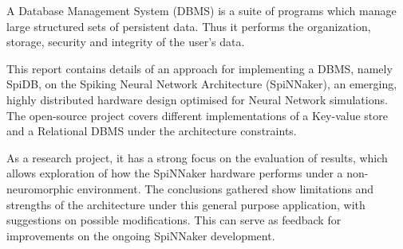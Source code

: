 A Database Management System (DBMS) is a suite of programs which manage large structured sets of persistent data.\cite{dbmsdef} Thus it performs the organization, storage, security and integrity of the user's data.

This report contains details of an approach for implementing a DBMS, namely SpiDB, on the Spiking Neural Network Architecture (SpiNNaker), an emerging, highly distributed hardware design optimised for Neural Network simulations. The open-source project covers different implementations of a Key-value store and a Relational DBMS under the architecture constraints.

As a research project, it has a strong focus on the evaluation of results, which allows exploration of how the SpiNNaker hardware performs under a non-neuromorphic environment. The conclusions gathered show limitations and strengths of the architecture under this general purpose application, with suggestions on possible modifications. This can serve as feedback for improvements on the ongoing SpiNNaker development.